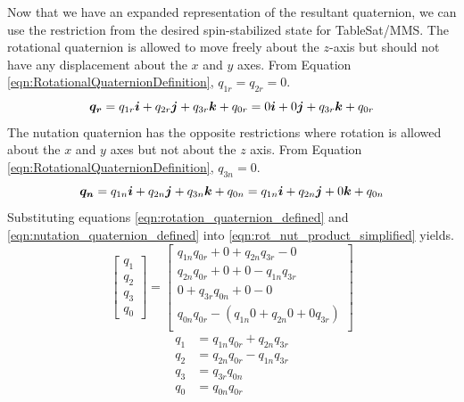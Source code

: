 Now that we have an expanded representation of the resultant quaternion, we can use the restriction from the desired spin-stabilized state for TableSat/MMS.  The rotational quaternion is allowed to move freely about the $z$-axis but should not have any displacement about the $x$ and $y$ axes.  From Equation \ref{eqn:RotationalQuaternionDefinition}, $q_{1r} = q_{2r} = 0$.
\begin{equation}
  \boldsymbol{q_{r}}
  = q_{1r} \boldsymbol{i} + q_{2r} \boldsymbol{j} + q_{3r} \boldsymbol{k} + q_{0r}
  = 0 \boldsymbol{i} + 0 \boldsymbol{j} + q_{3r} \boldsymbol{k} + q_{0r}
  \label{eqn:rotation_quaternion_defined}
\end{equation}
The nutation quaternion has the opposite restrictions where rotation is allowed about the $x$ and $y$ axes but not about the $z$ axis.  From Equation \ref{eqn:RotationalQuaternionDefinition}, $q_{3n} = 0$.
\begin{equation}
  \boldsymbol{q_{n}}
  = q_{1n} \boldsymbol{i} + q_{2n} \boldsymbol{j} + q_{3n} \boldsymbol{k} + q_{0n}
  = q_{1n} \boldsymbol{i} + q_{2n} \boldsymbol{j} + 0 \boldsymbol{k} + q_{0n}
  \label{eqn:nutation_quaternion_defined}
\end{equation}
Substituting equations \eqref{eqn:rotation_quaternion_defined} and \eqref{eqn:nutation_quaternion_defined} into \eqref{eqn:rot_nut_product_simplified} yields.
\begin{equation}
  \begin{bmatrix}
    q_{1} \\
    q_{2} \\
    q_{3} \\
    q_{0}
  \end{bmatrix}
  =
  \begin{bmatrix}
    q_{1n} q_{0r} + 0             + q_{2n} q_{3r} - 0 \\
    q_{2n} q_{0r} + 0             + 0             - q_{1n} q_{3r} \\
    0             + q_{3r} q_{0n} + 0             - 0 \\
  q_{0n} q_{0r} - (q_{1n} 0 + q_{2n} 0 + 0 q_{3r} ) \\
  \end{bmatrix}
\end{equation}
\begin{subequations}
  \begin{align}
    q_{1} &= q_{1n} q_{0r} + q_{2n} q_{3r} \label{eqn:rot_nut_1_1} \\
    q_{2} &= q_{2n} q_{0r} - q_{1n} q_{3r} \label{eqn:rot_nut_1_2} \\
    q_{3} &= q_{3r} q_{0n} \label{eqn:rot_nut_1_3} \\
    q_{0} &= q_{0n} q_{0r} \label{eqn:rot_nut_1_0}
  \end{align}
\end{subequations}
